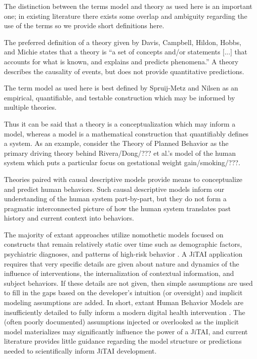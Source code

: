 \documentclass[runningheads,a4paper]{llncs}
\begin{document}
The distinction between the terms model and theory as used here is an important one; in existing literature there exists some overlap and ambiguity regarding the use of the terms so we provide short definitions here.

The preferred definition of a theory given by Davis, Campbell, Hildon, Hobbs, and Michie \cite{davis2014} states that a theory is “a set of concepts and/or statements [...] that accounts for what is known, and explains and predicts phenomena.”
A theory describes the causality of events, but does not provide quantitative predictions.

The term model as used here is best defined by Spruij-Metz and Nilsen \cite{spruijtmetz2014} as an empirical, quantifiable, and testable construction which may be informed by multiple theories.

Thus it can be said that a theory is a conceptualization which may inform a model, whereas a model is a mathematical construction that quantifiably defines a system.
As an example, consider the Theory of Planned Behavior \cite{Bandura???} as the primary driving theory behind Rivera/Dong/??? \cite{???} et al.’s model of the human system which puts a particular focus on gestational weight gain/smoking/???.

Theories paired with causal descriptive models provide means to conceptualize and predict human behaviors.
Such causal descriptive models inform our understanding of the human system part-by-part, but they do not form a pragmatic interconnected picture of how the human system translates past history and current context into behaviors.  


The majority of extant approaches utilize nomothetic models focused on constructs that remain relatively static over time such as demographic factors, psychiatric diagnoses, and patterns of high-risk behavior \cite{Spruijt-Metz, Nilsen, and Pavel, 2014}.
A JiTAI application requires that very specific details are given about nature and dynamics of the influence of interventions, the internalization of contextual information, and subject behaviors.
If these details are not given, then simple assumptions are used to fill in the gaps based on the developer’s intuition (or oversight) and implicit modeling assumptions are added.
In short, extant Human Behavior Models are insufficiently detailed to fully inform a modern digital health intervention \cite{riley2011}.
The (often poorly documented) assumptions injected or overlooked as the implicit model materializes may significantly influence the power of a JiTAI, and current literature provides little guidance regarding the model structure or predictions needed to scientifically inform JiTAI development.
\end{document}
